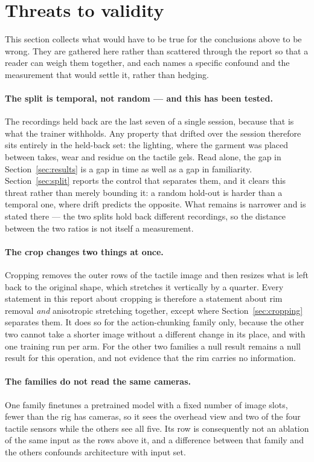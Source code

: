 \section{Threats to validity}
\label{sec:threats}

This section collects what would have to be true for the conclusions above to
be wrong. They are gathered here rather than scattered through the report so
that a reader can weigh them together, and each names a specific confound and
the measurement that would settle it, rather than hedging.

\paragraph{The split is temporal, not random --- and this has been tested.}
The recordings held back are the last seven of a single session, because that is
what the trainer withholds. Any property that drifted over the session therefore
sits entirely in the held-back set: the lighting, where the garment was placed
between takes, wear and residue on the tactile gels. Read alone, the gap in
Section~\ref{sec:results} is a gap in time as well as a gap in familiarity.
Section~\ref{sec:split} reports the control that separates them, and it clears
this threat rather than merely bounding it: a random hold-out is harder than a
temporal one, where drift predicts the opposite. What remains is narrower and
is stated there --- the two splits hold back different recordings, so the
distance between the two ratios is not itself a measurement.

\paragraph{The crop changes two things at once.}
Cropping removes the outer rows of the tactile image and then resizes what is
left back to the original shape, which stretches it vertically by a quarter.
Every statement in this report about cropping is therefore a statement about
rim removal \emph{and} anisotropic stretching together, except where
Section~\ref{sec:cropping} separates them. It does so for the action-chunking
family only, because the other two cannot take a shorter image without a
different change in its place, and with one training run per arm. For the
other two families a null result remains a null result for this operation, and
not evidence that the rim carries no information.

\paragraph{The families do not read the same cameras.}
One family finetunes a pretrained model with a fixed number of image slots,
fewer than the rig has cameras, so it sees the overhead view and two of the
four tactile sensors while the others see all five. Its row is consequently not
an ablation of the same input as the rows above it, and a difference between
that family and the others confounds architecture with input set.

